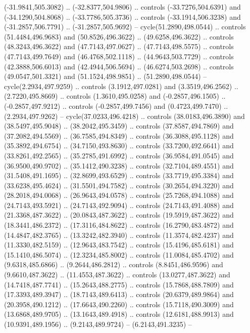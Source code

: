 \begin{scope}[shift={(58.28571,-442.36218)}]
    (-31.9841,505.3082) .. (-32.8377,504.9806) .. controls (-33.7276,504.6391) and
    (-34.1290,504.8068) .. (-33.7786,505.3736) .. controls (-33.1914,506.3238) and
    (-31.2857,506.7791) .. (-31.2857,505.9692) -- cycle(51.2890,498.0544) ..
    controls (51.4484,496.9683) and (50.8526,496.3622) .. (49.6258,496.3622) ..
    controls (48.3243,496.3622) and (47.7143,497.0627) .. (47.7143,498.5575) ..
    controls (47.7143,499.7649) and (46.4768,502.1118) .. (44.9643,503.7729) ..
    controls (42.3888,506.6013) and (42.4944,506.5694) .. (46.6274,503.2698) ..
    controls (49.0547,501.3321) and (51.1524,498.9851) .. (51.2890,498.0544) --
    cycle(2.2934,497.9259) .. controls (3.1912,497.0281) and (3.3519,496.2562) ..
    (2.7220,495.8669) .. controls (1.3610,495.0258) and (-0.2857,496.1505) ..
    (-0.2857,497.9212) .. controls (-0.2857,499.7456) and (0.4723,499.7470) ..
    (2.2934,497.9262) -- cycle(37.0233,496.4218) .. controls (38.0183,496.3890)
    and (38.5497,495.9048) .. (38.2042,495.3459) .. controls (37.8587,494.7869)
    and (37.2082,494.5569) .. (36.7585,494.8349) .. controls (36.3088,495.1128)
    and (35.3892,494.6754) .. (34.7150,493.8630) .. controls (33.7200,492.6641)
    and (33.8261,492.2565) .. (35.2785,491.6992) .. controls (36.9584,491.0545)
    and (36.9500,490.9702) .. (35.1412,490.3238) .. controls (32.7104,489.4551)
    and (31.5408,491.1695) .. (32.8699,493.6529) .. controls (33.7719,495.3384)
    and (33.6238,495.4624) .. (31.5501,494.7582) .. controls (30.2654,494.3220)
    and (28.2018,494.0068) .. (26.9643,494.0578) .. controls (25.7268,494.1088)
    and (24.7143,493.5921) .. (24.7143,492.9094) .. controls (24.7143,491.4088)
    and (21.3368,487.3622) .. (20.0843,487.3622) .. controls (19.5919,487.3622)
    and (18.3441,486.2372) .. (17.3116,484.8622) .. controls (16.2790,483.4872)
    and (14.4847,482.3765) .. (13.3242,482.3940) .. controls (11.3574,482.4237)
    and (11.3330,482.5159) .. (12.9643,483.7542) .. controls (15.4196,485.6181)
    and (15.1410,486.5074) .. (12.3234,485.8002) .. controls (11.0084,485.4702)
    and (9.6318,485.6866) .. (9.2644,486.2812) .. controls (8.8451,486.9596) and
    (9.6610,487.3622) .. (11.4553,487.3622) .. controls (13.0277,487.3622) and
    (14.7418,487.7741) .. (15.2643,488.2775) .. controls (15.7868,488.7809) and
    (17.3393,489.3947) .. (18.7143,489.6413) .. controls (20.6379,489.9864) and
    (20.3958,490.1212) .. (17.6643,490.2260) .. controls (15.7118,490.3009) and
    (13.6868,489.9705) .. (13.1643,489.4918) .. controls (12.6181,488.9913) and
    (10.9391,489.1956) .. (9.2143,489.9724) -- (6.2143,491.3235) --

\end{scope}
